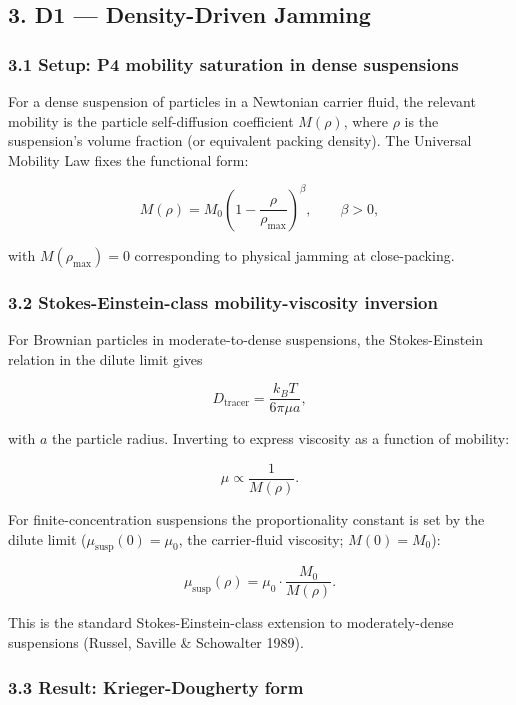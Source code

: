 \documentclass[
  11pt,a4paper]{article}
\begin{document}
\subsection{3. D1 --- Density-Driven
Jamming}\label{d1-density-driven-jamming}

\subsubsection{3.1 Setup: P4 mobility saturation in dense
suspensions}\label{setup-p4-mobility-saturation-in-dense-suspensions}

For a dense suspension of particles in a Newtonian carrier fluid, the
relevant mobility is the particle self-diffusion coefficient
\(M(\rho)\), where \(\rho\) is the suspension's volume fraction (or
equivalent packing density). The Universal Mobility Law fixes the
functional form:

\[M(\rho) = M_0 \left(1 - \frac{\rho}{\rho_\mathrm{max}}\right)^\beta, \qquad \beta > 0,\]

with \(M(\rho_\mathrm{max}) = 0\) corresponding to physical jamming at
close-packing.

\subsubsection{3.2 Stokes-Einstein-class mobility-viscosity
inversion}\label{stokes-einstein-class-mobility-viscosity-inversion}

For Brownian particles in moderate-to-dense suspensions, the
Stokes-Einstein relation in the dilute limit gives

\[D_\mathrm{tracer} = \frac{k_B T}{6\pi \mu a},\]

with \(a\) the particle radius. Inverting to express viscosity as a
function of mobility:

\[\mu \propto \frac{1}{M(\rho)}.\]

For finite-concentration suspensions the proportionality constant is set
by the dilute limit (\(\mu_\mathrm{susp}(0) = \mu_0\), the carrier-fluid
viscosity; \(M(0) = M_0\)):

\[\mu_\mathrm{susp}(\rho) = \mu_0 \cdot \frac{M_0}{M(\rho)}.\]

This is the standard Stokes-Einstein-class extension to moderately-dense
suspensions (Russel, Saville \& Schowalter 1989).

\subsubsection{3.3 Result: Krieger-Dougherty
form}\label{result-krieger-dougherty-form}
\end{document}
